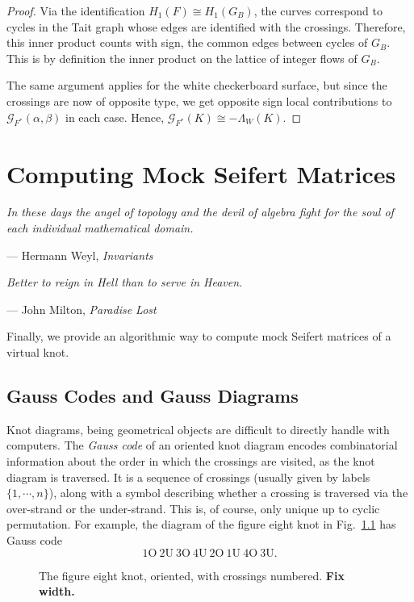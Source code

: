 \documentclass[12pt]{report}
\renewcommand{\over}{\text{O}}
\newcommand{\under}{\text{U}}
\newcommand{\notered}[1]{{\color{Red} \textbf{#1}}}
\theoremstyle{upright}
\begin{document}
\begin{proof}
Via the identification $H_{1}(F) \cong H_{1}(G_{B})$, the curves correspond to cycles in the Tait graph whose edges are identified with the crossings. Therefore, this inner product counts with sign, the common edges between cycles of $G_{B}$. This is by definition the inner product on the lattice of integer flows of $G_{B}$.

The same argument applies for the white checkerboard surface, but since the crossings are now of opposite type, we get opposite sign local contributions to $\mathcal{G}_{F^{*}}(\alpha, \beta)$ in each case. Hence, $\mathcal{G}_{F^{*}}(K) \cong -\Lambda_{W}(K)$.


\end{proof}

\chapter{Computing Mock Seifert Matrices}

\epigraph{\itshape In these days the angel of topology and the devil of algebra fight for the soul of each individual mathematical domain.}{--- Hermann Weyl, \textit{Invariants}}

\epigraph{\itshape Better to reign in Hell than to serve in Heaven.}{--- John Milton, \textit{Paradise Lost}}

Finally, we provide an algorithmic way to compute mock Seifert matrices of a virtual knot.

\section{Gauss Codes and Gauss Diagrams}

Knot diagrams, being geometrical objects are difficult to directly handle with computers. The \textit{Gauss code} of an oriented knot diagram encodes combinatorial information about the order in which the crossings are visited, as the knot diagram is traversed. It is a sequence of crossings (usually given by labels $\{1, \cdots, n\}$), along with a symbol describing whether a crossing is traversed via the over-strand or the under-strand. This is, of course, only unique up to cyclic permutation. For example, the diagram of the figure eight knot in Fig.~\ref{fig:figure_8} has Gauss code
\[1\over\ 2\under\ 3\over\ 4\under\ 2\over\ 1\under\ 4\over\ 3\under.\]

\begin{figure}[hbt]
	\centering
	\def\svgscale{0.3}
	
	
	\caption{The figure eight knot, oriented, with crossings numbered. \notered{Fix width.}}
	\label{fig:figure_8}
\end{figure}
\end{document}
